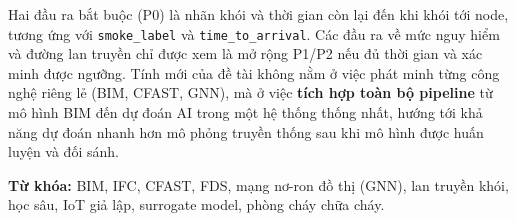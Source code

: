 Hai đầu ra bắt buộc (P0) là nhãn khói và thời gian còn lại đến khi khói tới node, tương ứng với \texttt{smoke\_label} và \texttt{time\_to\_arrival}. Các đầu ra về mức nguy hiểm và đường lan truyền chỉ được xem là mở rộng P1/P2 nếu đủ thời gian và xác minh được ngưỡng. Tính mới của đề tài không nằm ở việc phát minh từng công nghệ riêng lẻ (BIM, CFAST, GNN), mà ở việc \textbf{tích hợp toàn bộ pipeline} từ mô hình BIM đến dự đoán AI trong một hệ thống thống nhất, hướng tới khả năng dự đoán nhanh hơn mô phỏng truyền thống sau khi mô hình được huấn luyện và đối sánh.

\vspace{12pt}
\noindent\textbf{Từ khóa:} BIM, IFC, CFAST, FDS, mạng nơ-ron đồ thị (GNN), lan truyền khói, học sâu, IoT giả lập, surrogate model, phòng cháy chữa cháy.
